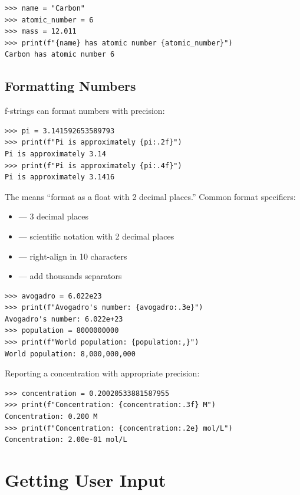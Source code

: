 \begin{lstlisting}
>>> name = "Carbon"
>>> atomic_number = 6
>>> mass = 12.011
>>> print(f"{name} has atomic number {atomic_number}")
Carbon has atomic number 6
\end{lstlisting}

\subsection{Formatting Numbers}

f-strings can format numbers with precision:

\begin{lstlisting}
>>> pi = 3.141592653589793
>>> print(f"Pi is approximately {pi:.2f}")
Pi is approximately 3.14
>>> print(f"Pi is approximately {pi:.4f}")
Pi is approximately 3.1416
\end{lstlisting}

The  means ``format as a float with 2 decimal places.'' Common format specifiers:

\begin{itemize}
    \item {} --- 3 decimal places
    \item {} --- scientific notation with 2 decimal places
    \item {} --- right-align in 10 characters
    \item \py{:,} --- add thousands separators
\end{itemize}

\begin{lstlisting}
>>> avogadro = 6.022e23
>>> print(f"Avogadro's number: {avogadro:.3e}")
Avogadro's number: 6.022e+23
>>> population = 8000000000
>>> print(f"World population: {population:,}")
World population: 8,000,000,000
\end{lstlisting}

\begin{labexample}
Reporting a concentration with appropriate precision:
\begin{lstlisting}
>>> concentration = 0.20020533881587955
>>> print(f"Concentration: {concentration:.3f} M")
Concentration: 0.200 M
>>> print(f"Concentration: {concentration:.2e} mol/L")
Concentration: 2.00e-01 mol/L
\end{lstlisting}
\end{labexample}

\section{Getting User Input}
\label{sec:input}

